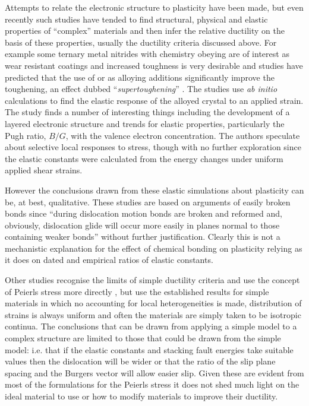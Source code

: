 Attempts to relate the electronic structure to plasticity have been made, but even recently such studies have tended to find structural, physical and elastic properties of ``complex'' materials and then infer the relative ductility on the basis of these properties, usually the ductility criteria discussed above. For example some ternary metal nitrides with chemistry obeying  are of interest as wear resistant coatings and increased toughness is very desirable and studies have predicted that the use of  or  as alloying additions significantly improve the toughening, an effect dubbed ``\emph{supertoughening}'' \cite{Sangiovanni2010,Sangiovanni2011}. The studies use \emph{ab initio} calculations to find the elastic response of the alloyed crystal to an applied strain. The study finds a number of interesting things including the development of a layered electronic structure and trends for elastic properties, particularly the Pugh ratio, $B/G$, with the valence electron concentration. The authors speculate about selective local responses to stress, though with no further exploration since the elastic constants were calculated from the energy changes under uniform applied shear strains.

However the conclusions drawn from these elastic simulations about plasticity can be, at best, qualitative. These studies are based on arguments of easily broken bonds since ``during dislocation motion bonds are broken and reformed and, obviously, dislocation glide will occur more easily in planes normal to those containing weaker bonds'' \cite{Sangiovanni2011} without further justification. Clearly this is not a mechanistic explanation for the effect of chemical bonding on plasticity relying as it does on dated and empirical ratios of elastic constants.


Other studies recognise the limits of simple ductility criteria and use the concept of Peierls stress more directly \cite{Music2008,Emmerlich2009,Gouriet2015}, but use the established results for simple materials in which no accounting for local heterogeneities is made, distribution of strains is always uniform and often the materials are simply taken to be isotropic continua. The conclusions that can be drawn from applying a simple model to a complex structure are limited to those that could be drawn from the simple model: i.e. that if the elastic constants and stacking fault energies take suitable values then the dislocation will be wider or that the ratio of the slip plane spacing and the Burgers vector will allow easier slip. Given these are evident from most of the formulations for the Peierls stress it does not shed much light on the ideal material to use or how to modify materials to improve their ductility.


